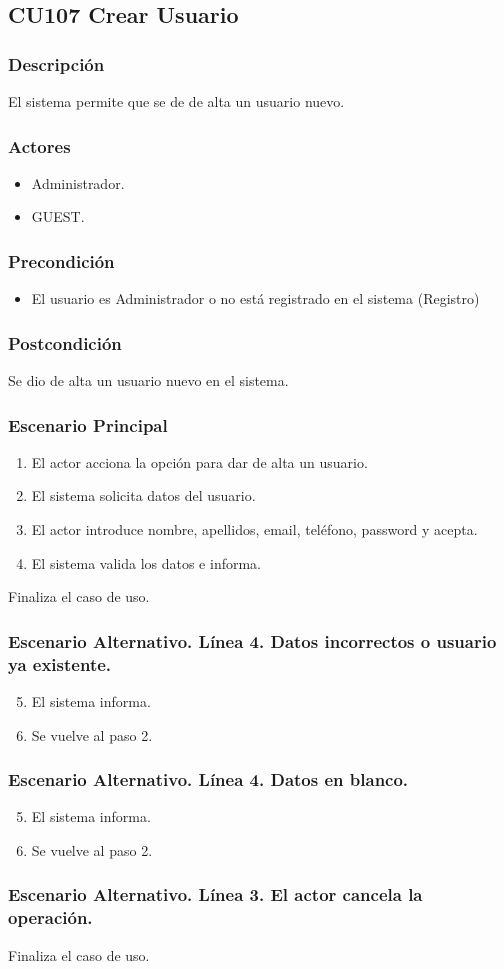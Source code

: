 \subsection{CU107 Crear Usuario}
\subsubsection{Descripci\'{o}n}
El sistema permite que se de de alta un usuario nuevo.
\subsubsection{Actores}
\begin{itemize}
\item Administrador.
\item GUEST.
\end{itemize}
\subsubsection{Precondici\'{o}n}
\begin{itemize}
\item El usuario es Administrador o no est\'{a} registrado en el sistema (Registro)
\end{itemize}
\subsubsection{Postcondici\'{o}n}
Se dio de alta un usuario nuevo en el sistema.
\subsubsection{Escenario Principal}
\begin{enumerate}
\item El actor acciona la opci\'{o}n para dar de alta un usuario.
\item El sistema solicita datos del usuario.
\item El actor introduce nombre, apellidos, email, tel\'{e}fono, password y acepta.
\item El sistema valida los datos e informa.
\end{enumerate}
Finaliza el caso de uso.
\subsubsection{Escenario Alternativo. L\'{i}nea 4. Datos incorrectos o usuario ya existente.}
\begin{enumerate}
\setcounter{enumi}{4}
\item El sistema informa.
\item Se vuelve al paso 2.
\end{enumerate}
\subsubsection{Escenario Alternativo. L\'{i}nea 4. Datos en blanco.}
\begin{enumerate}
\setcounter{enumi}{4}
\item El sistema informa.
\item Se vuelve al paso 2.
\end{enumerate}
\subsubsection{Escenario Alternativo. L\'{i}nea 3. El actor cancela la operaci\'{o}n.}
Finaliza el caso de uso.
